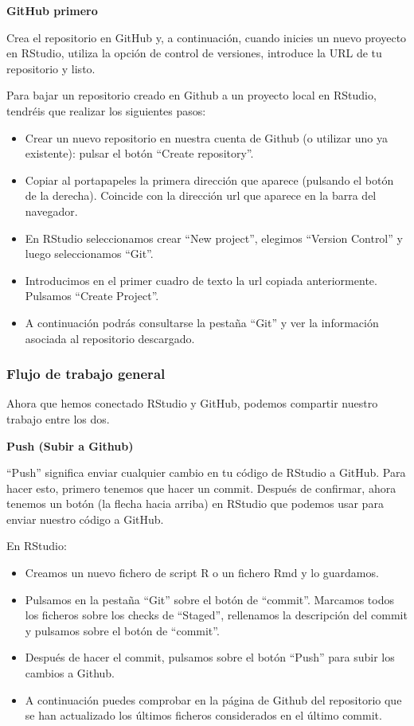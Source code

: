 \documentclass[
  letterpaper,
  DIV=11,
  numbers=noendperiod]{scrreprt}
\begin{document}
\textbf{GitHub primero}

Crea el repositorio en GitHub y, a continuación, cuando inicies un nuevo
proyecto en RStudio, utiliza la opción de control de versiones,
introduce la URL de tu repositorio y listo.

Para bajar un repositorio creado en Github a un proyecto local en
RStudio, tendréis que realizar los siguientes pasos:

\begin{itemize}
\item
  Crear un nuevo repositorio en nuestra cuenta de Github (o utilizar uno
  ya existente): pulsar el botón ``Create repository''.
\item
  Copiar al portapapeles la primera dirección que aparece (pulsando el
  botón de la derecha). Coincide con la dirección url que aparece en la
  barra del navegador.
\item
  En RStudio seleccionamos crear ``New project'', elegimos ``Version
  Control'' y luego seleccionamos ``Git''.
\item
  Introducimos en el primer cuadro de texto la url copiada
  anteriormente. Pulsamos ``Create Project''.
\item
  A continuación podrás consultarse la pestaña ``Git'' y ver la
  información asociada al repositorio descargado.
\end{itemize}

\hypertarget{flujo-de-trabajo-general}{%
\subsubsection{Flujo de trabajo
general}\label{flujo-de-trabajo-general}}

Ahora que hemos conectado RStudio y GitHub, podemos compartir nuestro
trabajo entre los dos.

\textbf{Push (Subir a Github)}

``Push'' significa enviar cualquier cambio en tu código de RStudio a
GitHub. Para hacer esto, primero tenemos que hacer un commit. Después de
confirmar, ahora tenemos un botón (la flecha hacia arriba) en RStudio
que podemos usar para enviar nuestro código a GitHub.

En RStudio:

\begin{itemize}
\item
  Creamos un nuevo fichero de script R o un fichero Rmd y lo guardamos.
\item
  Pulsamos en la pestaña ``Git'' sobre el botón de ``commit''. Marcamos
  todos los ficheros sobre los checks de ``Staged'', rellenamos la
  descripción del commit y pulsamos sobre el botón de ``commit''.
\item
  Después de hacer el commit, pulsamos sobre el botón ``Push'' para
  subir los cambios a Github.
\item
  A continuación puedes comprobar en la página de Github del repositorio
  que se han actualizado los últimos ficheros considerados en el último
  commit.
\end{itemize}
\end{document}
